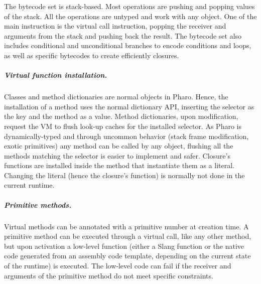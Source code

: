 \documentclass[a4paper,12pt,twoside]{../includes/ThesisStyle}
\begin{document}
The bytecode set is stack-based. Most operations are pushing and popping values of the stack. All the operations are untyped and work with any object. One of the main instruction is the virtual call instruction, popping the receiver and arguments from the stack and pushing back the result. The bytecode set also includes conditional and unconditional branches to encode conditions and loops, as well as specific bytecodes to create efficiently closures.









\subparagraph{Virtual function installation.}

Classes and method dictionaries are normal objects in Pharo. Hence, the installation of a method uses the normal dictionary API, inserting the selector as the key and the method as a value. Method dictionaries, upon modification, request the VM to flush look-up caches for the installed selector. As Pharo is dynamically-typed and through uncommon behavior (stack frame modification, exotic primitives) any method can be called by any object, flushing all the methods matching the selector is easier to implement and safer. Closure's functions are installed inside the method that instantiate them as a literal. Changing the literal (hence the closure's function) is normally not done in the current runtime.

\subparagraph{Primitive methods.}
\label{par:become}

Virtual methods can be annotated with a primitive number at creation time. A primitive method can be executed through a virtual call, like any other method, but upon activation a low-level function (either a Slang function or the native code generated from an assembly code template, depending on the current state of the runtime) is executed. The low-level code can fail if the receiver and arguments of the primitive method do not meet specific constraints. 
\end{document}
